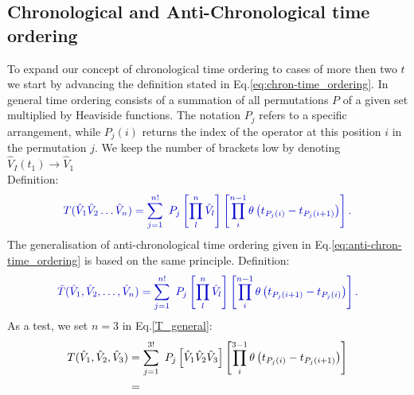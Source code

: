 \documentclass[
11pt, %
english, %
singlespacing, %
headsepline, %
]{MastersDoctoralThesis} %
\begin{document}
\begin{subappendices}
\section{Chronological and Anti-Chronological time ordering}\label{chronological_time}

To expand our concept  of chronological time ordering to cases of more then  two $  t $ we start by advancing the definition stated in Eq.\enskip\eqref{eq:chron-time_ordering}.
In general time ordering consists of a summation of all permutations $ P $ of a given set multiplied by Heaviside functions. The notation $ P_{j} $ refers to a specific arrangement, while $ P_{j}(i) $ returns the index of the operator at this position $ i $ in the permutation $ j $. 
We keep the number of brackets low by denoting $ \hat{V}_{I}(t_{1}) \rightarrow \hat{V}_{1} $ \\
Definition:
\begin{equation}\label{T_general}
\textcolor[RGB]{0,0,204}{
T(\hat{V}_1 \hat{V}_2\ldots\hat{V}_n)=
\sum_{j=1}^{n!}\ P_{j}
\left[
\prod^{n}_{l}\hat{V}_{l}
 \right]  
\left[
\prod^{n-1}_{i}
\theta
	\left(
	t_{P_{j}(i)}-t_{P_{j}(i+1) }
	\right)
\right]
.
}
\end{equation}
The generalisation of anti-chronological time ordering given in Eq.\enskip\eqref{eq:anti-chron-time_ordering} is based on the same principle. 
Definition:
\begin{equation}\label{T_bar_general}
\textcolor[RGB]{0,0,204}{
\bar{T}(\hat{V}_1, \hat{V}_2,\ldots,\hat{V}_n)=
\sum_{j=1}^{n!}\ P_{j}
\left[
\prod^{n}_{l}\hat{V}_{l}
 \right]  
\left[
\prod^{n-1}_{i}
\theta
	\left(
	t_{P_{j}(i+1)}-t_{P_{j}(i)}
	\right)
\right]
 .
}
\end{equation}
As a test, we set $ n=3 $ in Eq.\enskip\eqref{T_general}:
\begin{equation}
\begin{split}
T(\hat{V}_1, \hat{V}_2,\hat{V}_3)
&=
\sum_{j=1}^{3!}\ P_{j}
\left[
\hat{V}_1 \hat{V}_2\hat{V}_3
 \right]  
\left[
\prod^{3-1}_{i}
\theta
	\left(
	t_{P_{j}(i)}-t_{P_{j}(i+1) }
	\right)
\right]
\\
&=\enspace\thinspace\thinspace

\end{split}
\end{equation}
\end{subappendices}
\end{document}
